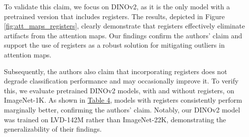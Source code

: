 \documentclass[10pt]{article} %
\begin{document}
To validate this claim, we focus on DINOv2, as it is the only model with a pretrained version that includes registers. The results, depicted in Figure \ref{fig:att_maps_registers}, clearly demonstrate that registers effectively eliminate artifacts from the attention maps. 
Our findings confirm the authors' claim and support the use of registers as a robust solution for mitigating outliers in attention maps.
 
Subsequently, the authors also claim that incorporating registers does not degrade classification performance and may occasionally improve it. To verify this, we evaluate pretrained DINOv2 models, with and without registers, on ImageNet-1K. As shown in \hyperref[tab:dino_results]{Table 4}, models with registers consistently perform marginally better, confirming the authors' claim. Notably, our DINOv2 model was trained on LVD-142M rather than ImageNet-22K, demonstrating the generalizability of their findings.
\end{document}

